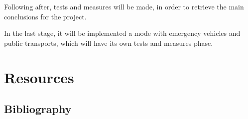\documentclass[10pt,a4paper]{article}
\begin{document}
    Following after, tests and measures will be made, in order to retrieve the main conclusions for the project.
    
    In the last stage, it will be implemented a mode with emergency vehicles and public transports, which will have its own tests and measures phase.

\newpage

\section{Resources}
\subsection{Bibliography}


\end{document}
